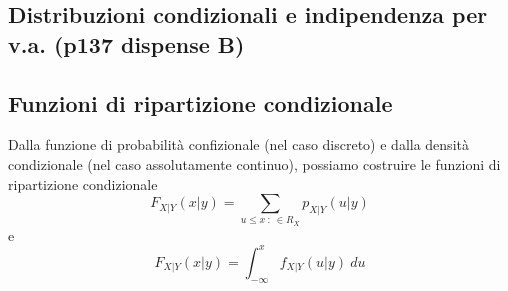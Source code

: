 \documentclass[a4paper]{report}
\begin{document}
  \subsection{Distribuzioni condizionali e indipendenza per v.a. (p137 dispense B)}

  \subsection{Funzioni di ripartizione condizionale}
  Dalla funzione di probabilità confizionale (nel caso discreto) e dalla densità condizionale (nel caso assolutamente continuo), possiamo costruire le funzioni di ripartizione condizionale
  \[ F_{X|Y}(x|y) = \sum_{u \leq x \: : \: \in R_X} p_{X|Y}(u|y) \]
  e
  \[ F_{X|Y}(x|y) = \int_{-\infty}^{x} f_{X|Y}(u|y) \: du \]
\end{document}
